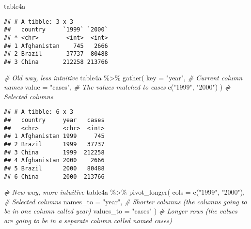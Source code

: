 \documentclass[
]{book}
\newenvironment{Shaded}{\begin{snugshade}}{\end{snugshade}}
\newcommand{\AttributeTok}[1]{\textcolor[rgb]{0.77,0.63,0.00}{#1}}
\newcommand{\CommentTok}[1]{\textcolor[rgb]{0.56,0.35,0.01}{\textit{#1}}}
\newcommand{\FunctionTok}[1]{\textcolor[rgb]{0.00,0.00,0.00}{#1}}
\newcommand{\NormalTok}[1]{#1}
\newcommand{\SpecialCharTok}[1]{\textcolor[rgb]{0.00,0.00,0.00}{#1}}
\newcommand{\StringTok}[1]{\textcolor[rgb]{0.31,0.60,0.02}{#1}}
\begin{document}
\begin{Shaded}
\begin{Highlighting}[]
\NormalTok{table4a }
\end{Highlighting}
\end{Shaded}

\begin{verbatim}
## # A tibble: 3 x 3
##   country     `1999` `2000`
## * <chr>        <int>  <int>
## 1 Afghanistan    745   2666
## 2 Brazil       37737  80488
## 3 China       212258 213766
\end{verbatim}

\begin{Shaded}
\begin{Highlighting}[]
\CommentTok{\# Old way, less intuitive}
\NormalTok{table4a }\SpecialCharTok{\%\textgreater{}\%}
  \FunctionTok{gather}\NormalTok{(}
    \AttributeTok{key =} \StringTok{"year"}\NormalTok{, }\CommentTok{\# Current column names}
    \AttributeTok{value =} \StringTok{"cases"}\NormalTok{, }\CommentTok{\# The values matched to cases}
    \FunctionTok{c}\NormalTok{(}\StringTok{"1999"}\NormalTok{, }\StringTok{"2000"}\NormalTok{)}
\NormalTok{  ) }\CommentTok{\# Selected columns}
\end{Highlighting}
\end{Shaded}

\begin{verbatim}
## # A tibble: 6 x 3
##   country     year   cases
##   <chr>       <chr>  <int>
## 1 Afghanistan 1999     745
## 2 Brazil      1999   37737
## 3 China       1999  212258
## 4 Afghanistan 2000    2666
## 5 Brazil      2000   80488
## 6 China       2000  213766
\end{verbatim}

\begin{Shaded}
\begin{Highlighting}[]
\CommentTok{\# New way, more intuitive}
\NormalTok{table4a }\SpecialCharTok{\%\textgreater{}\%}
  \FunctionTok{pivot\_longer}\NormalTok{(}
    \AttributeTok{cols =} \FunctionTok{c}\NormalTok{(}\StringTok{"1999"}\NormalTok{, }\StringTok{"2000"}\NormalTok{), }\CommentTok{\# Selected columns}
    \AttributeTok{names\_to =} \StringTok{"year"}\NormalTok{, }\CommentTok{\# Shorter columns (the columns going to be in one column called year)}
    \AttributeTok{values\_to =} \StringTok{"cases"}
\NormalTok{  ) }\CommentTok{\# Longer rows (the values are going to be in a separate column called named cases)}
\end{Highlighting}
\end{Shaded}
\end{document}
